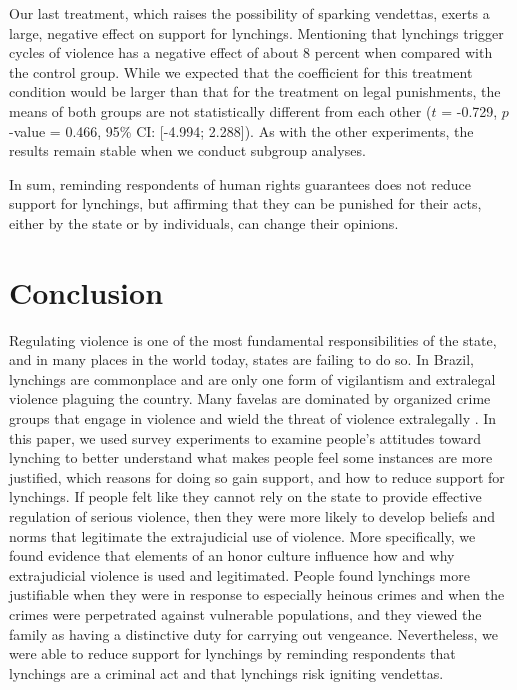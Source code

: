 \documentclass[12pt,a4paper]{article}
\begin{document}
Our last treatment, which raises the possibility of sparking vendettas, exerts a large, negative effect on support for lynchings. Mentioning that lynchings trigger cycles of violence has a negative effect of about 8 percent when compared with the control group. While we expected that the coefficient for this treatment condition would be larger than that for the treatment on legal punishments, the means of both groups are not statistically different from each other ($t$ = -0.729, $p$-value = 0.466, 95\% CI: [-4.994; 2.288]). As with the other experiments, the results remain stable when we conduct subgroup analyses. 

In sum, reminding respondents of human rights guarantees does not reduce support for lynchings, but affirming that they can be punished for their acts, either by the state or by individuals, can change their opinions.

\section{Conclusion}
\label{conclusion}

Regulating violence is one of the most fundamental responsibilities of the state, and in many places in the world today, states are failing to do so. In Brazil, lynchings are commonplace and are only one form of vigilantism and extralegal violence plaguing the country. Many favelas are dominated by organized crime groups that engage in violence and wield the threat of violence extralegally \citep{arias2006dynamics,barnes2017criminal}. In this paper, we used survey experiments to examine people's attitudes toward lynching to better understand what makes people feel some instances are more justified, which reasons for doing so gain support, and how to reduce support for lynchings. If people felt like they cannot rely on the state to provide effective regulation of serious violence, then they were more likely to develop beliefs and norms that legitimate the extrajudicial use of violence. More specifically, we found evidence that elements of an honor culture influence how and why extrajudicial violence is used and legitimated. People found lynchings more justifiable when they were in response to especially heinous crimes and when the crimes were perpetrated against vulnerable populations, and they viewed the family as having a distinctive duty for carrying out vengeance. Nevertheless, we were able to reduce support for lynchings by reminding respondents that lynchings are a criminal act and that lynchings risk igniting vendettas. 
\end{document}
